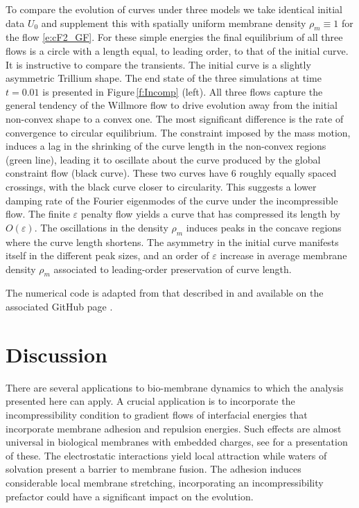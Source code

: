 \documentclass[11pt]{amsart}
\theoremstyle{plain}
\def\eps{\varepsilon}
\numberwithin{equation}{section}
\theoremstyle{plain}
\begin{document}
 To compare the evolution of curves  under three models we take identical initial data $U_0$ and supplement this with spatially uniform membrane density $\rho_m\equiv1$ for the flow \eqref{e:cF2_GF}. For these simple energies the final equilibrium of all three flows is a circle with a length equal, to leading order, to that of the initial curve.  It is instructive to compare the transients. The initial curve is a slightly asymmetric Trillium shape.  The end state of the three simulations at time $t=0.01$ is presented in Figure\,\ref{f:Incomp} (left). All three flows capture  the general tendency of the Willmore flow to drive evolution away from the initial non-convex shape to a convex one. The most significant difference is the rate of convergence to circular equilibrium. The constraint imposed by the mass motion, induces a lag in the shrinking of the curve length in the non-convex regions (green line), leading it to oscillate about the curve produced by the global constraint flow (black curve). These two curves have 6 roughly equally spaced crossings, with the black curve closer to circularity. This suggests a lower damping rate of the Fourier eigenmodes of the curve under the incompressible flow.   The finite $\eps$ penalty flow yields a curve that has compressed its length by $O(\eps)$.  The oscillations in the density $\rho_m$ induces peaks in the concave regions where the curve length  shortens. The asymmetry in the initial curve manifests itself in the different peak sizes, and an order of $\eps$ increase in average membrane density $\rho_m$ associated to leading-order preservation of curve length.

The numerical code is adapted from that described in \cite{NPW_25} and available on the associated GitHub page \cite{WGHub_25}.




\section{Discussion}

There are several applications to bio-membrane dynamics to which the analysis presented here can apply. A crucial application is to incorporate the incompressibility condition to gradient flows of interfacial energies that incorporate membrane adhesion and repulsion energies. Such effects are almost universal in biological membranes with embedded charges, see \cite{NPW_25} for a presentation of these. The electrostatic interactions yield local attraction while waters of solvation present a barrier to membrane fusion. The adhesion induces considerable local membrane stretching, incorporating an incompressibility prefactor could have a significant impact on the evolution.
\end{document}
